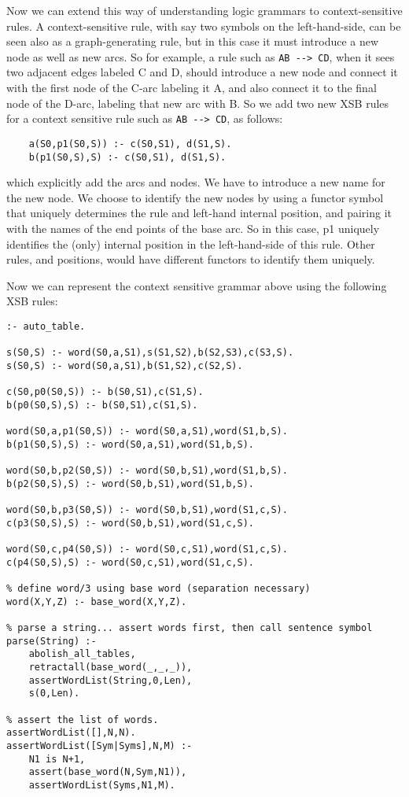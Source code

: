 Now we can extend this way of understanding logic grammars to
context-sensitive rules.  A context-sensitive rule, with say two
symbols on the left-hand-side, can be seen also as a graph-generating
rule, but in this case it must introduce a new node as well as new
arcs.  So for example, a rule such as \verb|AB --> CD|, when it sees
two adjacent edges labeled C and D, should introduce a new node and
connect it with the first node of the C-arc labeling it A, and also
connect it to the final node of the D-arc, labeling that new arc with
B.  So we add two new XSB rules for a context sensitive rule such as
\verb|AB --> CD|, as follows:
\begin{verbatim}
    a(S0,p1(S0,S)) :- c(S0,S1), d(S1,S).
    b(p1(S0,S),S) :- c(S0,S1), d(S1,S).
\end{verbatim}
which explicitly add the arcs and nodes.  We have to introduce a new
name for the new node.  We choose to identify the new nodes by using a
functor symbol that uniquely determines the rule and left-hand
internal position, and pairing it with the names of the end points of
the base arc.  So in this case, p1 uniquely identifies the (only)
internal position in the left-hand-side of this rule.  Other rules,
and positions, would have different functors to identify them
uniquely.

Now we can represent the context sensitive grammar above using the
following XSB rules:
\begin{verbatim}
:- auto_table.

s(S0,S) :- word(S0,a,S1),s(S1,S2),b(S2,S3),c(S3,S).
s(S0,S) :- word(S0,a,S1),b(S1,S2),c(S2,S).

c(S0,p0(S0,S)) :- b(S0,S1),c(S1,S).
b(p0(S0,S),S) :- b(S0,S1),c(S1,S).

word(S0,a,p1(S0,S)) :- word(S0,a,S1),word(S1,b,S).
b(p1(S0,S),S) :- word(S0,a,S1),word(S1,b,S).

word(S0,b,p2(S0,S)) :- word(S0,b,S1),word(S1,b,S).
b(p2(S0,S),S) :- word(S0,b,S1),word(S1,b,S).

word(S0,b,p3(S0,S)) :- word(S0,b,S1),word(S1,c,S).
c(p3(S0,S),S) :- word(S0,b,S1),word(S1,c,S).

word(S0,c,p4(S0,S)) :- word(S0,c,S1),word(S1,c,S).
c(p4(S0,S),S) :- word(S0,c,S1),word(S1,c,S).

% define word/3 using base word (separation necessary)
word(X,Y,Z) :- base_word(X,Y,Z).

% parse a string... assert words first, then call sentence symbol
parse(String) :-
    abolish_all_tables,
    retractall(base_word(_,_,_)),
    assertWordList(String,0,Len),
    s(0,Len).

% assert the list of words.
assertWordList([],N,N).
assertWordList([Sym|Syms],N,M) :-
    N1 is N+1,
    assert(base_word(N,Sym,N1)),
    assertWordList(Syms,N1,M).
\end{verbatim}

